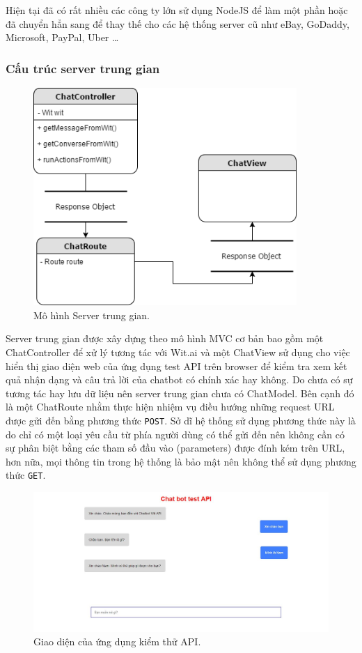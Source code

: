 \documentclass[12pt]{report}
\begin{document}
Hiện tại đã có rất nhiều các công ty lớn sử dụng NodeJS để làm một phần hoặc đã chuyển hẳn sang để thay thế cho các hệ thống server cũ như eBay, GoDaddy, Microsoft, PayPal, Uber \ldots

\subsubsection{Cấu trúc server trung gian}

\begin{figure}[H]
	\centering
    \includegraphics[width=10cm]{Pics/Chap6/server.png}
  	\caption{Mô hình Server trung gian.}
\end{figure}

Server trung gian được xây dựng theo mô hình MVC cơ bản bao gồm một ChatController để xử lý tương tác với Wit.ai và một ChatView sử dụng cho việc hiển thị giao diện web của ứng dụng test API trên browser để kiểm tra xem kết quả nhận dạng và câu trả lời của chatbot có chính xác hay không. Do chưa có sự tương tác hay lưu dữ liệu nên server trung gian chưa có ChatModel. Bên cạnh đó là một ChatRoute nhằm thực hiện nhiệm vụ điều hướng những request URL được gửi đến bằng phương thức \texttt{POST}. Sở dĩ hệ thống sử dụng phương thức này là do chỉ có một loại yêu cầu từ phía người dùng có thể gửi đến nên không cần có sự phân biệt bằng các tham số đầu vào (parameters) được đính kém trên URL, hơn nữa, mọi thông tin trong hệ thống là bảo mật nên không thể sử dụng phương thức \texttt{GET}.

\begin{figure}[H]
	\centering
    \includegraphics[width=15cm]{Pics/Chap6/test-api.JPG}
  	\caption{Giao diện của ứng dụng kiểm thử API.}
\end{figure}
\end{document}
